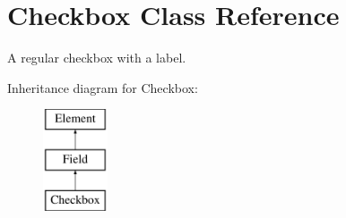 \hypertarget{class_checkbox}{
\section{Checkbox Class Reference}
\label{class_checkbox}
}


A regular checkbox with a label.  


Inheritance diagram for Checkbox:\begin{figure}[H]
\begin{center}
\leavevmode
\includegraphics[height=3.000000cm]{class_checkbox}
\end{center}
\end{figure}

